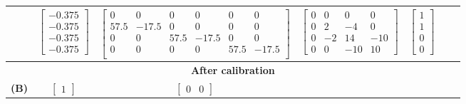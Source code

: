 \begin{sidewaystable}
{\begin{tabular}{c c c c c c c}
			& $\displaystyle \begin{bmatrix}

				-0.375 \\ -0.375 \\ -0.375 \\ -0.375
			\end{bmatrix}$


			& $\displaystyle \begin{bmatrix}
				0 & 0 & 0 & 0 & 0 & 0 \\
				57.5 & -17.5 & 0 & 0 & 0 & 0 \\
				0 & 0 & 57.5 & -17.5 & 0 & 0 \\
				0 & 0 & 0 & 0 & 57.5 & -17.5 \\
			\end{bmatrix}$
			& $\displaystyle \begin{bmatrix}

				0 & 0 & 0 & 0 \\

				0 & 2 & -4 & 0 \\

				0 & -2 & 14 & -10 \\
				0 & 0 & -10 & 10 \end{bmatrix}$

			& $\displaystyle \begin{bmatrix} 1 \\ 1 \\ 0 \\ 0 \end{bmatrix}$
			\\
			\midrule
			\multicolumn{7}{c}{\footnotesize\textbf{After calibration}}\\
			\midrule
			\textbf{(B)}

			& $\displaystyle \begin{bmatrix} 1 \end{bmatrix}$

			& $\displaystyle \begin{bmatrix} 0 & 0 \end{bmatrix}$


\end{tabular}}
\end{sidewaystable}
